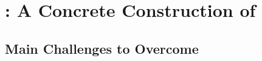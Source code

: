  
 
 
%  
 
 

 

  

  




\section{\withFai: A Concrete Construction of \p}

\subsection{Main Challenges to Overcome}

